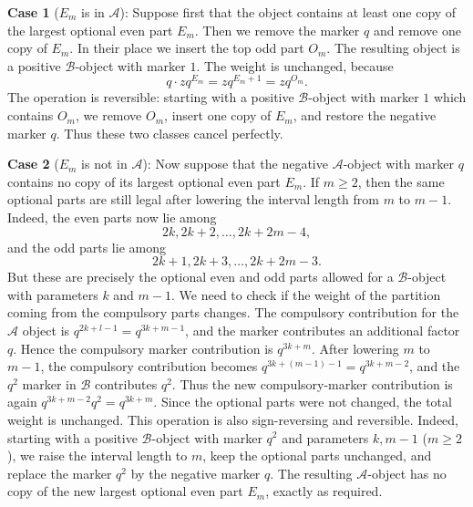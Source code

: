 \documentclass[reqno]{amsart}
\theoremstyle{definition}
\theoremstyle{plain}
\theoremstyle{remark}
\numberwithin{equation}{section}
\begin{document}
\noindent \textbf{Case 1} ($E_m$ is in $\mathcal A$): Suppose first that the object contains at least one copy of the largest
optional even part $E_m$. Then we remove the marker \(q\) and remove one copy of \(E_m\).  In their place we insert the top odd part $O_m$. The resulting object is a positive \(\mathcal B\)-object with marker \(1\). The weight is unchanged, because
\[
q\cdot zq^{E_m}=zq^{E_m+1}=zq^{O_m}.
\]
The operation is reversible: starting with a positive \(\mathcal B\)-object with marker
\(1\) which contains \(O_m\), we remove \(O_m\), insert one copy of \(E_m\), and restore the negative marker \(q\).  Thus these two classes cancel
perfectly.

\noindent \textbf{Case 2} ($E_m$ is not in $\mathcal A$): Now suppose that the negative \(\mathcal A\)-object with marker \(q\) contains no copy
of its largest optional even part \(E_m\).  If \(m\ge2\), then the same
optional parts are still legal after lowering the interval length from \(m\)
to \(m-1\).  Indeed, the even parts now lie among
\[
2k,2k+2,\ldots,2k+2m-4,
\]
and the odd parts lie among
\[
2k+1,2k+3,\ldots,2k+2m-3.
\]
But these are precisely the optional even and odd parts allowed for a
\(\mathcal B\)-object with parameters \(k\) and \(m-1\). We need to check if the weight of the partition coming from the compulsory parts changes. The compulsory contribution for the $\mathcal A$ object is $q^{2k+l-1}=q^{3k+m-1}$, and the marker contributes an additional factor \(q\).  Hence the compulsory marker contribution is $q^{3k+m}$. After lowering \(m\) to \(m-1\), the compulsory contribution becomes $q^{3k+(m-1)-1}=q^{3k+m-2}$, and the $q^2$ marker in $\mathcal B$ contributes \(q^2\).  Thus the new compulsory-marker contribution is again $q^{3k+m-2}q^2=q^{3k+m}$. Since the optional parts were not changed, the total weight is unchanged. This operation is also sign-reversing and reversible. 
Indeed, starting with a positive \(\mathcal B\)-object
with marker \(q^2\) and parameters \(k, m-1\) ($m\ge 2$), we raise the interval length to
\(m\), keep the optional parts unchanged, and replace the marker \(q^2\) by
the negative marker \(q\).  The resulting \(\mathcal A\)-object has no copy of the new
largest optional even part \(E_m\), exactly as required.
\end{document}
